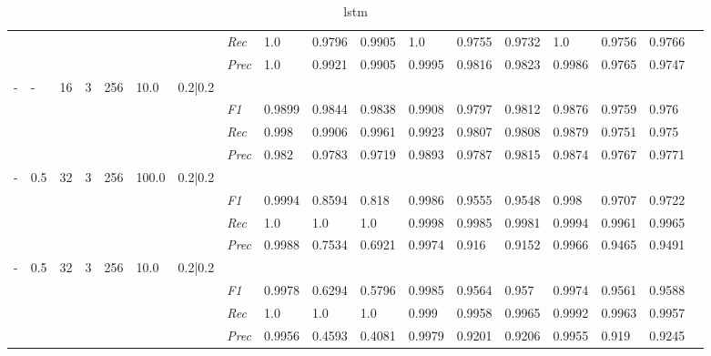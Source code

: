 \begin{table}[]
\begin{tabularx}{\textwidth}{XXXXXXX|X|XXX|XXX|XXXX}
& & & & & & & \textit{Rec} & 1.0 & 0.9796 & 0.9905    & 1.0 & 0.9755    & 0.9732    & 1.0    & 0.9756    & 0.9766    \\
& & & & & & & \textit{Prec} & 1.0 & 0.9921 & 0.9905 & 0.9995 & 0.9816 & 0.9823 & 0.9986 & 0.9765 & 0.9747 \\ \midrule
- & - & 16 & 3 & 256 &10.0 & 0.2|0.2 & & & & & & & & & \\
& & & & & & & \textit{F1} & 0.9899 & 0.9844 & 0.9838 & 0.9908 & 0.9797        & 0.9812        & 0.9876        & 0.9759        & 0.976        \\
& & & & & & & \textit{Rec} & 0.998 & 0.9906 & 0.9961    & 0.9923 & 0.9807    & 0.9808    & 0.9879    & 0.9751    & 0.975    \\
& & & & & & & \textit{Prec} & 0.982 & 0.9783 & 0.9719 & 0.9893 & 0.9787 & 0.9815 & 0.9874 & 0.9767 & 0.9771 \\ \midrule
- & 0.5 & 32 & 3 & 256 &100.0 & 0.2|0.2 & & & & & & & & & \\
& & & & & & & \textit{F1} & 0.9994 & 0.8594 & 0.818 & 0.9986 & 0.9555        & 0.9548        & 0.998        & 0.9707        & 0.9722        \\
& & & & & & & \textit{Rec} & 1.0 & 1.0 & 1.0    & 0.9998 & 0.9985    & 0.9981    & 0.9994    & 0.9961    & 0.9965    \\
& & & & & & & \textit{Prec} & 0.9988 & 0.7534 & 0.6921 & 0.9974 & 0.916 & 0.9152 & 0.9966 & 0.9465 & 0.9491 \\ \midrule
- & 0.5 & 32 & 3 & 256 &10.0 & 0.2|0.2 & & & & & & & & & \\
& & & & & & & \textit{F1} & 0.9978 & 0.6294 & 0.5796 & 0.9985 & 0.9564        & 0.957        & 0.9974        & 0.9561        & 0.9588        \\
& & & & & & & \textit{Rec} & 1.0 & 1.0 & 1.0    & 0.999 & 0.9958    & 0.9965    & 0.9992    & 0.9963    & 0.9957    \\
& & & & & & & \textit{Prec} & 0.9956 & 0.4593 & 0.4081 & 0.9979 & 0.9201 & 0.9206 & 0.9955 & 0.919 & 0.9245 \\ \midrule
\end{tabularx}
\caption{lstm}
\label{tab:all_results_lstm}
\end{table}